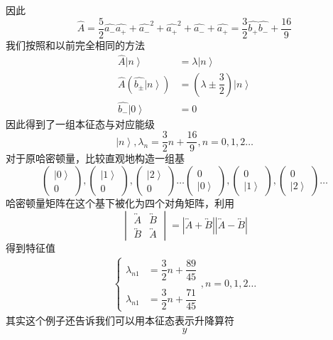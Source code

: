 \documentclass[12pt, a4paper, oneside]{ctexart}
\begin{document}
	\quad\quad 因此
	\begin{equation}
		\hat{A}=\dfrac{5}{2}\hat{a_{-}}\hat{a_{+}}+\hat{a_{-}}^{2}+\hat{a_{+}}^{2}+\hat{a_{-}}+\hat{a_{+}}=\dfrac{3}{2}\hat{b_{+}}\hat{b_{-}}+\dfrac{16}{9}
	\end{equation}
	\quad\quad 我们按照和以前完全相同的方法
	\begin{align}
		\hat{A}\left|n\right>&=\lambda\left|n\right>\\
		\hat{A}\left(\hat{b_{\pm}}\left|n\right>\right)&=\left(\lambda\pm\dfrac{3}{2}\right)\left|n\right>\\
		\hat{b_{-}}\left|0\right>&=0
	\end{align}
	\quad\quad 因此得到了一组本征态与对应能级
	\begin{equation}
		\left|n\right>,\lambda_{n}=\dfrac{3}{2}n+\dfrac{16}{9},n=0,1,2\dots
	\end{equation}
	\quad\quad 对于原哈密顿量，比较直观地构造一组基
	\begin{equation}
		\begin{pmatrix}
		\left|0\right>	\\
			0
		\end{pmatrix},
		\begin{pmatrix}
			\left|1\right>	\\
			0
		\end{pmatrix},
		\begin{pmatrix}
			\left|2\right>	\\
			0
		\end{pmatrix}\dots
		\begin{pmatrix}
				0	\\
		\left|0\right>
		\end{pmatrix},
		\begin{pmatrix}
			0	\\
			\left|1\right>
		\end{pmatrix},
		\begin{pmatrix}
			0	\\
			\left|2\right>
		\end{pmatrix}\dots
	\end{equation}
	\quad\quad 哈密顿量矩阵在这个基下被化为四个对角矩阵，利用
	\begin{equation}
		\begin{vmatrix}
		\overleftrightarrow{A}	&\overleftrightarrow{B} \\
		\overleftrightarrow{B}	&\overleftrightarrow{A}
		\end{vmatrix}=\left|\overleftrightarrow{A}+\overleftrightarrow{B}\right|\left|\overleftrightarrow{A}-\overleftrightarrow{B}\right|
	\end{equation}
	\quad\quad 得到特征值
	\begin{align}
		\left\{\begin{matrix}
		\lambda_{n1}&=\dfrac{3}{2}n+\dfrac{89}{45}	\\\\
		\lambda_{n1}&=\dfrac{3}{2}n+\dfrac{71}{45}
		\end{matrix}\right.,n=0,1,2\dots
	\end{align}
	\quad\quad 其实这个例子还告诉我们可以用本征态表示升降算符
	\begin{equation}
		y
	\end{equation}
\end{document}
